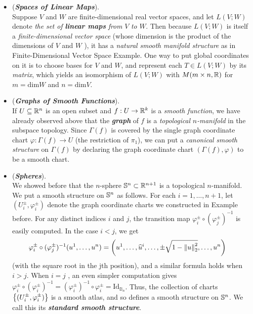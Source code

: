 \documentclass[11pt]{article}
\begin{document}
\begin{itemize}
\item \begin{example} (\emph{\textbf{Spaces of Linear Maps}}).\\
Suppose $V$ and $W$ are finite-dimensional real vector spaces, and let $L(V ; W)$ denote \emph{the set of \textbf{linear maps} from $V$ to $W$}. Then because $L(V ; W)$ is itself a \emph{finite-dimensional vector space} (whose dimension is the product of the dimensions of $V$ and $W$ ), it has a \emph{natural smooth manifold structure} as in Finite-Dimensional Vector Space Example. One way to put global coordinates on it is to choose bases for $V$ and $W$, and represent each $T \in L(V ; W)$ by its \emph{matrix}, which yields an isomorphism of $L(V ; W)$ with $M(m \times n, {\mathbb R})$ for $m = \text{dim} W$ and $n = \text{dim} V$.
\end{example}

\item \begin{example} (\textbf{\emph{Graphs of Smooth Functions}}).\\
If $U \subseteq {\mathbb R}^n$ is an open subset and $f: U \rightarrow {\mathbb R}^k$ is a \emph{smooth function}, we have already observed above that the \emph{\textbf{graph}} of $f$ is a \emph{topological $n$-manifold} in the subspace topology. Since $\Gamma(f)$ is covered by the single graph coordinate chart $\varphi: \Gamma(f) \rightarrow U$ (the restriction of $\pi_1$), we can put a \emph{canonical smooth structure} on $\Gamma(f)$ by declaring the graph coordinate chart $(\Gamma(f), \varphi)$ to be a smooth chart.
\end{example}

\item \begin{example} (\emph{\textbf{Spheres}}). \\
We showed before that the $n$-sphere ${\mathbb S}^n \subset {\mathbb R}^{n+1}$ is a topological $n$-manifold. We put a smooth structure on ${\mathbb S}^n$ as follows. For each $i = 1,\ldots,n+1$, let $(U_{i}^{\pm}, \varphi_{i}^{\pm})$ denote the graph coordinate charts we constructed in Example before. For any distinct indices $i$ and $j$, the transition map $\varphi_{i}^{\pm} \circ (\varphi_{j}^{\pm})^{-1}$ is easily computed. In the case $i < j$, we get
\begin{align*}
\varphi_{i}^{\pm} \circ (\varphi_{j}^{\pm})^{-1}(u^1,\ldots, u^{n}) &= \left(u^1,\ldots, \widehat{u}^{i},\ldots, \pm \sqrt{1 - \left\|u\right\|_{2}^2}, \ldots, u^{n}\right)
\end{align*} (with the square root in the j$ $th position), and a similar formula holds when $i > j$.
 When $i = j$ , an even simpler computation gives $\varphi_{i}^{\pm} \circ (\varphi_{i}^{\pm})^{-1} = (\varphi_{i}^{\pm})^{-1} \circ \varphi_{i}^{\pm} = \text{Id}_{\mathbb{B}_{n}}$. Thus, the collection of charts  $\left\{(U_{i}^{\pm}, \varphi_{i}^{\pm})\right\}$ is a smooth atlas, and so defines a smooth structure on ${\mathbb S}^n$. We call this its \emph{\textbf{standard smooth structure}}.
 \end{example}


\end{itemize}
\end{document}
